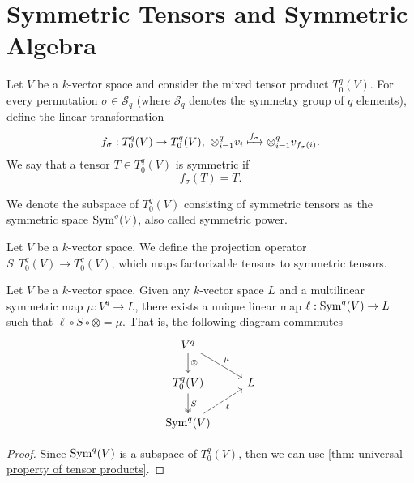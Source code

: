 \section{Symmetric Tensors and Symmetric Algebra}

\begin{definition}
  Let \(V\) be a \(k\)-vector space and consider the mixed tensor product
  \(T_0^q(V)\). For every permutation \(\sigma \in \mathcal S_q\) (where
  \(\mathcal S_q\) denotes the symmetry group of \(q\) elements), define the
  linear transformation
  \[
    f_\sigma: T_0^q(V) \to T_0^q(V),\ \otimes_{i=1}^q v_i \xmapsto{f_\sigma}
    \otimes_{i=1}^q v_{f_\sigma(i)}.
  \]
  We say that a tensor \(T \in T_0^q(V)\) is symmetric if
  \[
     f_\sigma(T) = T.
  \]
\end{definition}

\begin{definition}
  We denote the subspace of \(T_0^q(V)\) consisting of symmetric tensors as the
  symmetric space \(\operatorname{Sym}^q(V)\), also called symmetric power.
\end{definition}

\begin{definition}
  Let \(V\) be a \(k\)-vector space. We define the projection operator \(S:
  T_0^q(V) \to T_0^q(V)\), which maps factorizable tensors to symmetric tensors.
\end{definition}

\begin{proposition}
  Let \(V\) be a \(k\)-vector space. Given any \(k\)-vector space \(L\) and a
  multilinear symmetric map \(\mu: V^q \to L\), there exists a unique linear map
  \(\ell: \operatorname{Sym}^q(V) \to L\) such that \(\ell \circ S \circ \otimes = \mu\). That
  is, the following diagram commmutes
  \[
    \begin{tikzcd}
      V^q \ar[rd, "\mu"] \ar[d, "\otimes"] \\
      T_0^q(V) \ar[d, two heads, "S"]
          &L \\
      \Sym^q(V) \ar[ru, dashed, swap, "\ell"]
    \end{tikzcd}
  \]
\end{proposition}

\begin{proof}
  Since \(\operatorname{Sym}^q(V)\) is a subspace of \(T_0^q(V)\), then we can use
  \cref{thm: universal property of tensor products}.
\end{proof}

